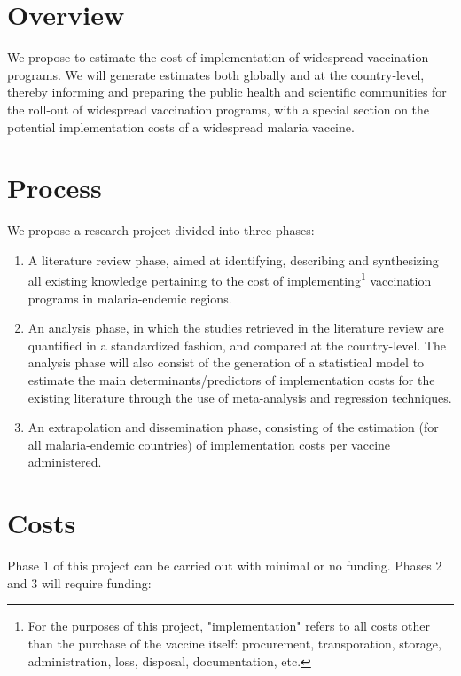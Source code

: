 \documentclass{article}
\begin{document}
\newpage

\section*{Overview}

We propose to estimate the cost of implementation of widespread vaccination programs. We will generate estimates both globally and at the country-level, thereby informing and preparing the public health and scientific communities for the roll-out of widespread vaccination programs, with a special section on the potential implementation costs of a widespread malaria vaccine.


\section*{Process}

We propose a research project divided into three phases:

\begin{enumerate}
  \setlength\itemsep{0em}
\item A literature review phase, aimed at identifying, describing and synthesizing all existing knowledge pertaining to the cost of implementing\footnote{For the purposes of this project, "implementation" refers to all costs other than the purchase of the vaccine itself: procurement, transporation, storage, administration, loss, disposal, documentation, etc.} vaccination programs in malaria-endemic regions.
\item An analysis phase, in which the studies retrieved in the literature review are quantified in a standardized fashion, and compared at the country-level. The analysis phase will also consist of the generation of a statistical model to estimate the main determinants/predictors of implementation costs for the existing literature through the use of meta-analysis and regression techniques.
\item An extrapolation and dissemination phase, consisting of the estimation (for all malaria-endemic countries) of implementation costs per vaccine administered.
\end{enumerate}

\section*{Costs}

Phase 1 of this project can be carried out with minimal or no funding. Phases 2 and 3 will require funding:
\end{document}
